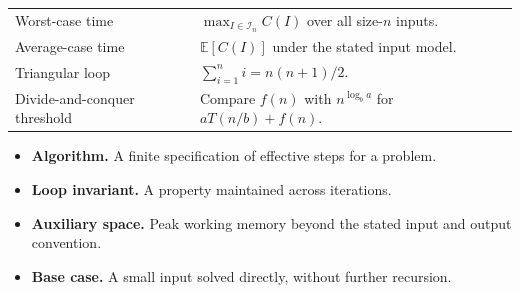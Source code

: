 \documentclass[12pt,a4paper]{article}
\renewcommand{\arraystretch}{1.45}
\begin{document}
\begin{tcolorbox}[formulabox, title={Key Concepts at a Glance}]
\renewcommand{\arraystretch}{1.35}
\noindent\begin{tabularx}{\linewidth}{B{4.5cm}Y}
Worst-case time & $\max_{I\in\mathcal I_n} C(I)$ over all size-$n$ inputs. \\[3pt]
Average-case time & $\mathbb E[C(I)]$ under the stated input model. \\[3pt]
Triangular loop & $\sum_{i=1}^n i=n(n+1)/2$. \\[3pt]
Divide-and-conquer threshold & Compare $f(n)$ with $n^{\log_b a}$ for $aT(n/b)+f(n)$. \\[3pt]
\end{tabularx}\par
\end{tcolorbox}

\begin{tcolorbox}[defbox, title={One-Line Definitions}]
\begin{itemize}[leftmargin=*, itemsep=3pt, topsep=4pt]
  \item \textbf{Algorithm.} A finite specification of effective steps for a problem.
  \item \textbf{Loop invariant.} A property maintained across iterations.
  \item \textbf{Auxiliary space.} Peak working memory beyond the stated input and output convention.
  \item \textbf{Base case.} A small input solved directly, without further recursion.
\end{itemize}
\end{tcolorbox}
\end{document}
